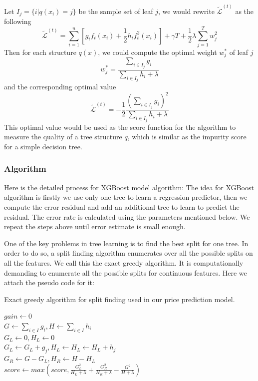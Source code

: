 \documentclass[letterpaper]{article}
\begin{document}
Let $I_j = \{i| q(x_i) = j\}$ be the sample set of leaf $j$, we would rewrite $\tilde{\mathcal{L}}^{(t)}$ as the following
$$
\tilde{\mathcal{L}}^{(t)} = \sum_{i = 1}^n[g_if_t(x_i) + \frac{1}{2}h_if_t^2(x_i)] + \gamma T + \frac{1}{2}\lambda\sum_{j = 1}^Tw_j^2
$$
Then for each structure $q(x)$, we could compute the optimal weight $w_j^{*}$ of leaf $j$
$$
w_j^{*} = \frac{ \sum_{i \in I_j}g_i}{ \sum_{i \in I_j}h_i + \lambda}
$$
and the corresponding optimal value
$$
\tilde{\mathcal{L}}^{(t)}  = -\frac{1}{2}\frac{(\sum_{i \in I_j}g_i)^2}{\sum_{i \in I_j}h_i + \lambda}
$$
This optimal value would be used as the score function for the algorithm to measure the quality of a tree structure $q$, which is similar as the impurity score for a simple decision tree.

\subsubsection{Algorithm}

Here is the detailed process for XGBoost model algorithm:
The idea for XGBoost algorithm is firstly we use only one tree to learn a regression predictor, then we compute the error residual and add an additional tree to learn to predict the residual. The error rate is calculated using the parameters mentioned below. We repeat the steps above until error estimate is small enough.

One of the key problems in tree learning is to find the best split for one tree. In order to do so, a split finding algorithm enumerates over all the possible splits on all the features. We call this the exact greedy algorithm. It is computationally demanding to enumerate all the possible splits for continuous features. Here we attach the pseudo code for it:

\begin{algorithm}[htbp]
            \caption{Exact greedy algorithm for split finding used in our price prediction model.}
            
            $gain \gets 0$\\
            $G \gets \sum_{i \in I} g_i, H \gets \sum_{i \in I} h_i$\\ 
            { 
            $G_L \gets 0, H_L \gets 0$\\
                { 
                    $G_L \gets G_L + g_j, H_L \gets H_L \gets H_L + h_j$\\
                    $G_R \gets G - G_L, H_R \gets H - H_L$\\
                    $score \gets max(score, \frac{G_L^2}{H_L + \lambda} + \frac{G_R^2}{H_R + \lambda} - \frac{G^2}{H + \lambda})$
                }  
            } 
            
\end{algorithm}
\end{document}
